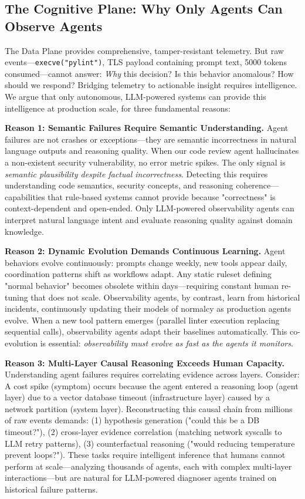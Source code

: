 \documentclass[sigplan,screen,9pt]{acmart}
\begin{document}
\subsection{The Cognitive Plane: Why Only Agents Can Observe Agents}

The Data Plane provides comprehensive, tamper-resistant telemetry. But raw events—\texttt{execve("pylint")}, TLS payload containing prompt text, 5000 tokens consumed—cannot answer: \emph{Why} this decision? Is this behavior anomalous? How should we respond? Bridging telemetry to actionable insight requires intelligence. We argue that only autonomous, LLM-powered systems can provide this intelligence at production scale, for three fundamental reasons:

\textbf{Reason 1: Semantic Failures Require Semantic Understanding.} Agent failures are not crashes or exceptions—they are semantic incorrectness in natural language outputs and reasoning quality. When our code review agent hallucinates a non-existent security vulnerability, no error metric spikes. The only signal is \emph{semantic plausibility despite factual incorrectness}. Detecting this requires understanding code semantics, security concepts, and reasoning coherence—capabilities that rule-based systems cannot provide because "correctness" is context-dependent and open-ended. Only LLM-powered observability agents can interpret natural language intent and evaluate reasoning quality against domain knowledge.

\textbf{Reason 2: Dynamic Evolution Demands Continuous Learning.} Agent behaviors evolve continuously: prompts change weekly, new tools appear daily, coordination patterns shift as workflows adapt. Any static ruleset defining "normal behavior" becomes obsolete within days—requiring constant human re-tuning that does not scale. Observability agents, by contrast, learn from historical incidents, continuously updating their models of normalcy as production agents evolve. When a new tool pattern emerges (parallel linter execution replacing sequential calls), observability agents adapt their baselines automatically. This co-evolution is essential: \emph{observability must evolve as fast as the agents it monitors}.

\textbf{Reason 3: Multi-Layer Causal Reasoning Exceeds Human Capacity.} Understanding agent failures requires correlating evidence across layers. Consider: A cost spike (symptom) occurs because the agent entered a reasoning loop (agent layer) due to a vector database timeout (infrastructure layer) caused by a network partition (system layer). Reconstructing this causal chain from millions of raw events demands: (1) hypothesis generation ("could this be a DB timeout?"), (2) cross-layer evidence correlation (matching network syscalls to LLM retry patterns), (3) counterfactual reasoning ("would reducing temperature prevent loops?"). These tasks require intelligent inference that humans cannot perform at scale—analyzing thousands of agents, each with complex multi-layer interactions—but are natural for LLM-powered diagnoser agents trained on historical failure patterns.
\end{document}
